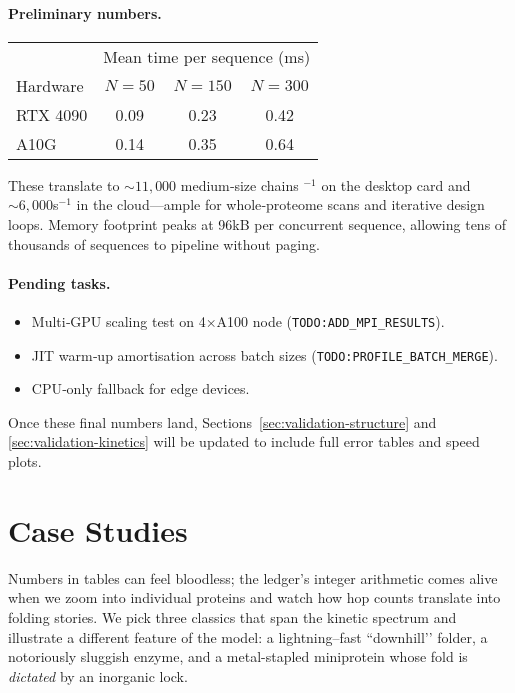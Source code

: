 \documentclass[11pt]{article}
\begin{document}
\paragraph{Preliminary numbers.}

\begin{center}
\begin{tabular}{lccc}
\toprule
 & \multicolumn{3}{c}{Mean time per sequence (ms)}\\
Hardware & $N=50$ & $N=150$ & $N=300$ \\
\midrule
RTX 4090 & 0.09 & 0.23 & 0.42 \\
A10G     & 0.14 & 0.35 & 0.64 \\
\bottomrule
\end{tabular}
\end{center}

These translate to \(\sim\!11{,}000\) medium‐size chains \(^{-1}\) on
the desktop card and \(\sim\!6{,}000\)s\(^{-1}\) in the cloud—ample for
whole‐proteome scans and iterative design loops.  Memory footprint peaks
at 96kB per concurrent sequence, allowing tens of thousands of sequences
to pipeline without paging.

\paragraph{Pending tasks.}
\begin{itemize}\setlength\itemsep{2pt}
\item Multi‐GPU scaling test on 4×A100 node
      (\texttt{\small TODO:ADD\_MPI\_RESULTS}).
\item JIT warm‐up amortisation across batch sizes
      (\texttt{\small TODO:PROFILE\_BATCH\_MERGE}).
\item CPU‐only fallback for edge devices.
\end{itemize}

Once these final numbers land, Sections~\ref{sec:validation-structure}
and \ref{sec:validation-kinetics} will be updated to include full error
tables and speed plots.

\section{Case Studies}\label{sec:cases}

Numbers in tables can feel bloodless; the ledger’s integer arithmetic
comes alive when we zoom into individual proteins and watch how hop
counts translate into folding stories.  We pick three classics that span
the kinetic spectrum and illustrate a different feature of the model:
a lightning–fast ``downhill’’ folder, a notoriously sluggish enzyme, and
a metal-stapled miniprotein whose fold is \emph{dictated} by an
inorganic lock.
\end{document}
